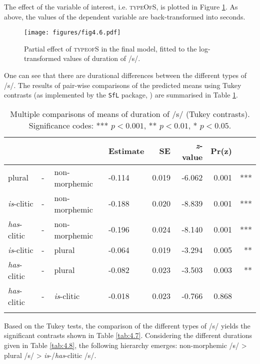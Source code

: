 The effect of the variable of interest, i.e. \textsc{typeOfS}, is plotted in Figure \ref{fig:4_6}. As above, the values of the dependent variable are back-transformed into seconds.

\begin{figure}
    \centering
    \texttt{[image: figures/fig4.6.pdf]}
    \caption{Partial effect of \textsc{typeofS} in the final model, fitted to the log-transformed values of duration of /s/.}
    \label{fig:4_6}
\end{figure}

One can see that there are durational differences between the different types of /s/. The results of pair-wise comparisons of the predicted means using Tukey contrasts (as implemented by the \texttt{SfL} package, \cite{Schmitz2021sfl}) are summarised in Table \ref{tab:4.6}.

\begin{table}\fontsize{10}{11}
\caption{Multiple comparisons of means of duration of /s/ (Tukey contrasts). Significance codes: *** $p < 0.001$, ** $p < 0.01$, * $p < 0.05$.}
\label{tab:4.6}
\centering
\begin{tabular}{llllrrrr} 
\lsptoprule
~                   & ~ & ~                  & Estimate & SE    & \textit{z}-value & Pr(\textbar{}z\textbar{}) & ~    \\ 
\midrule
plural              & - & non-morphemic      & -0.114   & 0.019 & -6.062           & 
  0.001                  & ***  \\
\textit{is}-clitic  & - & non-morphemic      & -0.188   & 0.020 & -8.839           &  0.001                    & ***  \\
\textit{has}-clitic & - & non-morphemic      & -0.196   & 0.024 & -8.140           & 
  0.001                  & ***  \\
\textit{is}-clitic  & - & plural             & -0.064   & 0.019 & -3.294           & 0.005                     & **   \\
\textit{has}-clitic & - & plural             & -0.082   & 0.023 & -3.503           & 0.003                     & **   \\
\textit{has}-clitic & - & \textit{is}-clitic & -0.018   & 0.023 & -0.766           & 0.868                     & ~    \\
\lspbottomrule
\end{tabular}
\end{table}

Based on the Tukey tests, the comparison of the different types of /s/ yields the significant contrasts shown in Table \ref{tab:4.7}. Considering the different durations given in Table \ref{tab:4.8}, the following hierarchy emerges: non-morphemic /s/ > plural /s/ > \textit{is}-/\textit{has}-clitic /s/.

